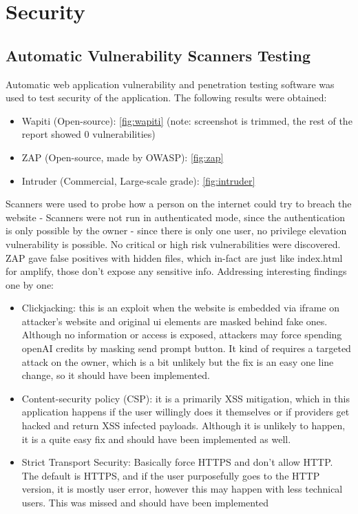 \section{Security}
\subsection{Automatic Vulnerability Scanners Testing}
Automatic web application vulnerability and penetration testing software was used to test security of the application. The following results were obtained: 
\begin{itemize}
    \item Wapiti (Open-source): \ref{fig:wapiti} (note: screenshot is trimmed, the rest of the report showed 0 vulnerabilities)
    \item ZAP (Open-source, made by OWASP): \ref{fig:zap}
    \item Intruder (Commercial, Large-scale grade): \ref{fig:intruder}
\end{itemize}
Scanners were used to probe how a person on the internet could try to breach the website - Scanners were not run in authenticated mode, since the authentication is only possible by the owner - since there is only one user, no privilege elevation vulnerability is possible. No critical or high risk vulnerabilities were discovered. ZAP gave false positives with hidden files, which in-fact are just like index.html for amplify, those don't expose any sensitive info.  Addressing interesting findings one by one: 
\begin{itemize}
    \item Clickjacking: this is an exploit when the website is embedded via iframe on attacker's website and original ui elements are masked behind fake ones. Although no information or access is exposed, attackers may force spending openAI credits by masking send prompt button. It kind of requires a targeted attack on the owner, which is a bit unlikely but the fix is an easy one line change, so it should have been implemented.
    \item Content-security policy (CSP): it is a primarily XSS mitigation, which in this application happens if the user willingly does it themselves or if providers get hacked and return XSS infected payloads. Although it is unlikely to happen, it is a quite easy fix and should have been implemented as well. 
    \item Strict Transport Security: Basically force HTTPS and don't allow HTTP. The default is HTTPS, and if the user purposefully goes to the HTTP version, it is mostly user error, however this may happen with less technical users. This was missed and should have been implemented
\end{itemize}
